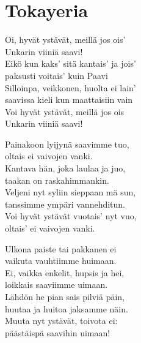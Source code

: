 \section{Tokayeria}
\vspace{-0.5cm}
Oi, hyvät ystävät, meillä jos ois'\\
Unkarin viiniä saavi!\\
Eikö kun kaks' sitä kantais' ja jois'\\
paksusti voitais' kuin Paavi\\
Silloinpa, veikkonen, huolta ei lain'\\
saavissa kieli kun maattaisiin vain\\
Voi hyvät ystävät, meillä jos ois\\
Unkarin viiniä saavi!

Painakoon lyijynä saavimme tuo,\\
oltais ei vaivojen vanki.\\
Kantava hän, joka laulaa ja juo,\\
taakan on raskahimmankin.\\
Veljeni nyt syliin sieppaan mä sun,\\
tanssimme ympäri vannehditun.\\
Voi hyvät ystävät vuotais' nyt vuo,\\
oltais' ei vaivojen vanki.

Ulkona paiste tai pakkanen ei\\
vaikuta vauhtiimme huimaan.\\
Ei, vaikka enkelit, hupsis ja hei,\\
loikkais saaviimme uimaan.\\
Lähdön he pian sais pilviä päin,\\
huutaa ja huitoa jaksamme näin.\\
Muuta nyt ystävät, toivota ei:\\
päästäispä saavihin uimaan!